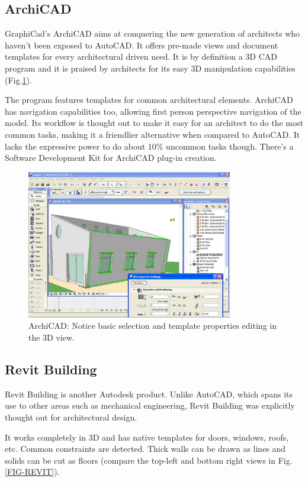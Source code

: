 \subsection{ArchiCAD}
GraphiCad's ArchiCAD \cite{SITE-ARCHICAD} aims at conquering the new generation of architects who haven't been exposed to AutoCAD.
It offers pre-made views and document templates for every architectural driven need.
It is by definition a 3D CAD program and it is praised by architects for its easy 3D
manipulation capabilities (Fig.\ref{FIG-ARCHICAD}).

The program features templates for common architectural elements.
ArchiCAD has navigation capabilities too, allowing first person perspective navigation of the model.
Its workflow is thought out to make it easy for an architect to do the most common tasks,
making it a friendlier alternative when compared to AutoCAD.
It lacks the expressive power to do about 10\% uncommon tasks though.
There's a Software Development Kit for ArchiCAD plug-in creation.

\begin{figure}[!ht]
    \centering
    \includegraphics[width=9cm]{gfx/archicad-1.png}
    \caption{ArchiCAD: Notice basic selection and template properties editing in the 3D view.}
    \label{FIG-ARCHICAD}
\end{figure}

\subsection{Revit Building}
Revit Building \cite{SITE-REVIT} is another Autodesk product.
Unlike AutoCAD, which spans its use to other areas such as mechanical engineering,
Revit Building was explicitly thought out for architectural design.

It works completely in 3D and has native templates for doors, windows, roofs, etc.
Common constraints are detected. Thick walls can be drawn as lines and solids can
be cut as floors (compare the top-left and bottom right views in Fig.\ref{FIG-REVIT}).

